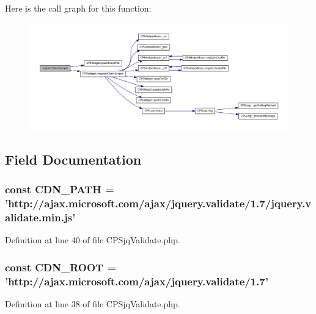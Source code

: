 Here is the call graph for this function:\nopagebreak
\begin{figure}[H]
\begin{center}
\leavevmode
\includegraphics[width=400pt]{classCPSjqValidate_ac02a66bde8e72e4909137bf748edf665_cgraph}
\end{center}
\end{figure}




\subsection{Field Documentation}
\hypertarget{classCPSjqValidate_a25f81b1e2d2ce6f2521bc8c4c4877382}{
\subsubsection[{CDN\_\-PATH}]{\setlength{\rightskip}{0pt plus 5cm}const {\bf CDN\_\-PATH} = 'http://ajax.microsoft.com/ajax/jquery.validate/1.7/jquery.validate.min.js'}}
\label{classCPSjqValidate_a25f81b1e2d2ce6f2521bc8c4c4877382}


Definition at line 40 of file CPSjqValidate.php.

\hypertarget{classCPSjqValidate_a2f10f690c9bdb966a20b0c1fedd4e9d7}{
\subsubsection[{CDN\_\-ROOT}]{\setlength{\rightskip}{0pt plus 5cm}const {\bf CDN\_\-ROOT} = 'http://ajax.microsoft.com/ajax/jquery.validate/1.7'}}
\label{classCPSjqValidate_a2f10f690c9bdb966a20b0c1fedd4e9d7}


Definition at line 38 of file CPSjqValidate.php.

